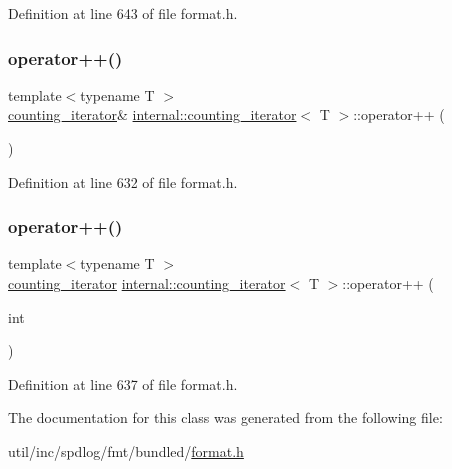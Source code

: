 Definition at line 643 of file format.\+h.

\mbox{\label{classinternal_1_1counting__iterator_a30040f9f47ccc17bb246fa0d55795e63}} 
\subsubsection{\texorpdfstring{operator++()}{operator++()}\hspace{0.1cm}{\footnotesize\ttfamily [1/2]}}
{\footnotesize\ttfamily template$<$typename T $>$ \\
\hyperlink{classinternal_1_1counting__iterator}{counting\+\_\+iterator}\& \hyperlink{classinternal_1_1counting__iterator}{internal\+::counting\+\_\+iterator}$<$ T $>$\+::operator++ (\begin{DoxyParamCaption}{ }\end{DoxyParamCaption})\hspace{0.3cm}{\ttfamily [inline]}}



Definition at line 632 of file format.\+h.

\mbox{\label{classinternal_1_1counting__iterator_add98096772b9b8e8f5da7ae625c000c5}} 
\subsubsection{\texorpdfstring{operator++()}{operator++()}\hspace{0.1cm}{\footnotesize\ttfamily [2/2]}}
{\footnotesize\ttfamily template$<$typename T $>$ \\
\hyperlink{classinternal_1_1counting__iterator}{counting\+\_\+iterator} \hyperlink{classinternal_1_1counting__iterator}{internal\+::counting\+\_\+iterator}$<$ T $>$\+::operator++ (\begin{DoxyParamCaption}\item[{int}]{ }\end{DoxyParamCaption})\hspace{0.3cm}{\ttfamily [inline]}}



Definition at line 637 of file format.\+h.



The documentation for this class was generated from the following file\+:\begin{DoxyCompactItemize}
\item 
util/inc/spdlog/fmt/bundled/\hyperlink{format_8h}{format.\+h}\end{DoxyCompactItemize}
